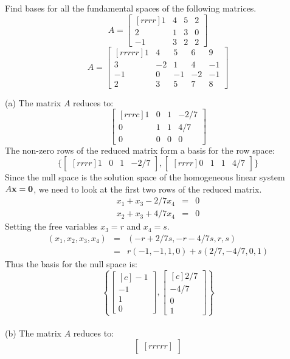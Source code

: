 \ii Find bases for all the fundamental spaces of the following matrices.
\bb
\ii 
$$
A = 
\begin{bmatrix}[rrrr]
1&4&5&2\\
2&1&3&0\\
-1&3&2&2
\end{bmatrix}
$$
\ii 
$$
A = 
\begin{bmatrix}[rrrrr]
1&4&5&6&9\\
3&-2&1&4&-1\\
-1&0&-1&-2&-1\\
2&3&5&7&8
\end{bmatrix}
$$
\ee
\begin{solution}
\noindent (a) The matrix $A$ reduces to:
$$
\begin{bmatrix}[rrrc]
1&0&1&-2/7\\
0&1&1&4/7\\
0&0&0&0
\end{bmatrix}
$$
The non-zero rows of the reduced matrix form a basis for the row space:
$$\{
\begin{bmatrix}[rrrr]
1&0&1&-2/7
\end{bmatrix},
\begin{bmatrix}[rrrr]
0&1&1&4/7
\end{bmatrix}\}$$
Since the null space is the solution space of the homogeneous linear system $A\boldx = \textbf{0}$, we need to look at the first two rows of the reduced matrix.
\begin{eqnarray*}
x_1 + x_3 - 2/7x_4 &=& 0\\
x_2 + x_3 +4/7x_4 &=& 0
\end{eqnarray*}
Setting the free variables $x_3 = r$ and $x_4 = s$.
\begin{eqnarray*}
(x_1,x_2,x_3,x_4) &=& (-r + 2/7s, -r-4/7s,r,s)\\
&=& r(-1,-1,1,0) + s(2/7,-4/7,0,1)
\end{eqnarray*}
Thus the basis for the null space is:
$$
\left\{
\begin{bmatrix}[c]
-1\\
-1\\
1\\
0
\end{bmatrix}
,
\begin{bmatrix}[c]
2/7\\
-4/7\\
0\\
1
\end{bmatrix}
\right\}
$$
\\
(b) The 
matrix $A$ reduces to:
$$
\begin{bmatrix}[rrrrr]

\end{bmatrix}$$
\end{solution}
